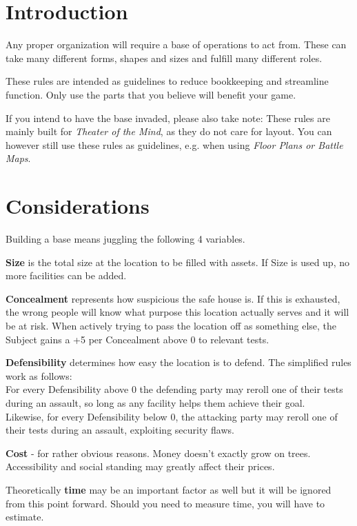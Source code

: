 \documentclass[12pt,a4paper,openany,usenames,dvipsnames]{book}
\begin{document}
	

	\chapter{Introduction}
	Any proper organization will require a base of operations to act from.
	These can take many different forms, shapes and sizes and fulfill many different roles.
	\par
	These rules are intended as guidelines to reduce bookkeeping and streamline function.
	Only use the parts that you believe will benefit your game.
	\par
	If you intend to have the base invaded, please also take note:
	These rules are mainly built for \emph{Theater of the Mind}, as they do not care for layout.
	You can however still use these rules as guidelines, e.g. when using \emph{Floor Plans or Battle Maps}.

	\chapter{Considerations}
	\vspace*{-10mm}
	Building a base means juggling the following 4 variables.\par
	\textbf{Size} is the total size at the location to be filled with assets.
		If Size is used up, no more facilities can be added.\par
	\textbf{Concealment} represents how suspicious the safe house is.
		If this is exhausted, the wrong people will know what purpose this location actually serves and it will be at risk.
		When actively trying to pass the location off as something else,
			the Subject gains a +5 per Concealment above 0 to relevant tests.\par
	\textbf{Defensibility} determines how easy the location is to defend.
		The simplified rules work as follows:\\
		For every Defensibility above 0 the defending party may reroll one of their tests during an assault,
			so long as any facility helps them achieve their goal.\\
		Likewise, for every Defensibility below 0,
			the attacking party may reroll one of their tests during an assault,
			exploiting security flaws.\par
	\textbf{Cost} - for rather obvious reasons.
		Money doesn't exactly grow on trees.
		Accessibility and social standing may greatly affect their prices.\par
	Theoretically \textbf{time} may be an important factor as well but it will be ignored from this point forward.
		Should you need to measure time, you will have to estimate.
\end{document}
